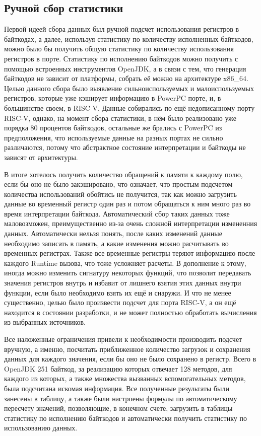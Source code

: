 \subsection{Ручной сбор статистики}

Первой идеей сбора данных был ручной подсчет использования регистров в байткодах, а далее, используя статистику по количеству исполненных байткодов, можно было бы получить общую статистику по количеству использования регистров в порте. Статистику по исполнению байткодов можно получить с помощью встроенных инструментов OpenJDK, а в связи с тем, что генерация байткодов не зависит от платформы, собрать её можно на архитектуре x86\_64. Целью данного сбора было выявление сильноиспользуемых и малоиспользуемых регистров, которые уже кэширует информацию в PowerPC порте, и, в большинстве своем, в RISC-V. Данные собирались по ещё недописанному порту RISC-V, однако, на момент сбора статистики, в нём было реализовано уже порядка 80 процентов байткодов, остальные же брались с PowerPC из предположения, что используемые данные на разных портах не сильно различаются, потому что абстрактное состояние интерпретации и байткоды не зависят от архитектуры.

В итоге хотелось получить количество обращений к памяти к каждому полю, если бы оно не было закэшировано, что означает, что простым подсчетом количества использований обойтись не получится, так как можно загрузить данные во временный регистр один раз и потом обращаться к ним много раз во время интерпретации байткода. Автоматический сбор таких данных тоже маловозможен, преимущественно из-за очень сложной интерпретации измененния данных. Автоматически нельзя понять, после каких изменений данные необходимо записать в память, а какие изменения можно расчитывать во временных регистрах. Также все временные регистры теряют информацию после каждого Runtime вызова, что тоже усложняет расчеты. В дополнение к этому, иногда можно изменить сигнатуру некоторых функций, что позволит передавать значения регистров внутрь и избавит от лишнего взятия этих данных внутри функции, если было необходимо взять их ещё и снаружи. И что не менее существенно, целью было произвести подсчет для порта RISC-V, а он ещё находится в состоянии разработки, и не может полностью обработать вычисления из выбранных источников. 

Все наложенные ограничения привели к необходимости производить подсчет вручную, а именно, посчитать приближенное количество загрузок и сохранения данных для каждого значения, если бы оно не было сохранено в регистр. Всего в OpenJDK 251 байткод, за реализацию которых отвечает 128 методов, для каждого из которых, а также множества вызванных вспомогательных методов, была подсчитана искомая информация. Все полученные результаты были занесены в таблицу, а также были настроены формулы по автоматическому пересчету значений, позволяющие, в конечном счете, загрузить в таблицы статистику по исполнению байткодов и автоматически получить статистику по использованию данных.

